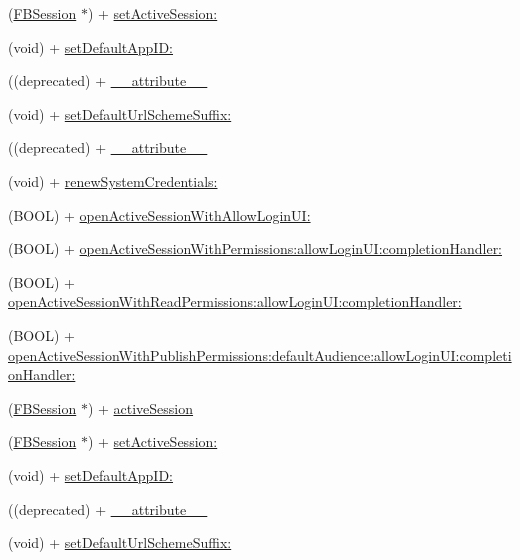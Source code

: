 \begin{DoxyCompactItemize}
\item 
(\hyperlink{interfaceFBSession}{F\+B\+Session} $\ast$) + \hyperlink{interfaceFBSession_af1b30bea1e3251f8d75f76b10369756e}{set\+Active\+Session\+:}
\item 
(void) + \hyperlink{interfaceFBSession_afb4f41ffcd4d824a16147cb41b932a32}{set\+Default\+App\+I\+D\+:}
\item 
((deprecated) + \hyperlink{interfaceFBSession_aab7b90337909b905920a4067b5253c2b}{\+\_\+\+\_\+attribute\+\_\+\+\_\+}
\item 
(void) + \hyperlink{interfaceFBSession_ac3d4f0df3cae8fe5091b9d98b9f166d4}{set\+Default\+Url\+Scheme\+Suffix\+:}
\item 
((deprecated) + \hyperlink{interfaceFBSession_aab7b90337909b905920a4067b5253c2b}{\+\_\+\+\_\+attribute\+\_\+\+\_\+}
\item 
(void) + \hyperlink{interfaceFBSession_a3b4d7c16af36ea5690d19bf77065dfaf}{renew\+System\+Credentials\+:}
\item 
(B\+O\+OL) + \hyperlink{interfaceFBSession_abe6b20f6e3202521b7ecb4115c8e865d}{open\+Active\+Session\+With\+Allow\+Login\+U\+I\+:}
\item 
(B\+O\+OL) + \hyperlink{interfaceFBSession_ac90957d41f538f96b5d8c9087ad3ad2d}{open\+Active\+Session\+With\+Permissions\+:allow\+Login\+U\+I\+:completion\+Handler\+:}
\item 
(B\+O\+OL) + \hyperlink{interfaceFBSession_add12d4669d7e770d8fedeab148ca5dd9}{open\+Active\+Session\+With\+Read\+Permissions\+:allow\+Login\+U\+I\+:completion\+Handler\+:}
\item 
(B\+O\+OL) + \hyperlink{interfaceFBSession_a727a1541ad09287fb613a018e100534d}{open\+Active\+Session\+With\+Publish\+Permissions\+:default\+Audience\+:allow\+Login\+U\+I\+:completion\+Handler\+:}
\item 
(\hyperlink{interfaceFBSession}{F\+B\+Session} $\ast$) + \hyperlink{interfaceFBSession_aaf6863ab39e2f67733792453874d3870}{active\+Session}
\item 
(\hyperlink{interfaceFBSession}{F\+B\+Session} $\ast$) + \hyperlink{interfaceFBSession_af1b30bea1e3251f8d75f76b10369756e}{set\+Active\+Session\+:}
\item 
(void) + \hyperlink{interfaceFBSession_afb4f41ffcd4d824a16147cb41b932a32}{set\+Default\+App\+I\+D\+:}
\item 
((deprecated) + \hyperlink{interfaceFBSession_aab7b90337909b905920a4067b5253c2b}{\+\_\+\+\_\+attribute\+\_\+\+\_\+}
\item 
(void) + \hyperlink{interfaceFBSession_ac3d4f0df3cae8fe5091b9d98b9f166d4}{set\+Default\+Url\+Scheme\+Suffix\+:}

\end{DoxyCompactItemize}
